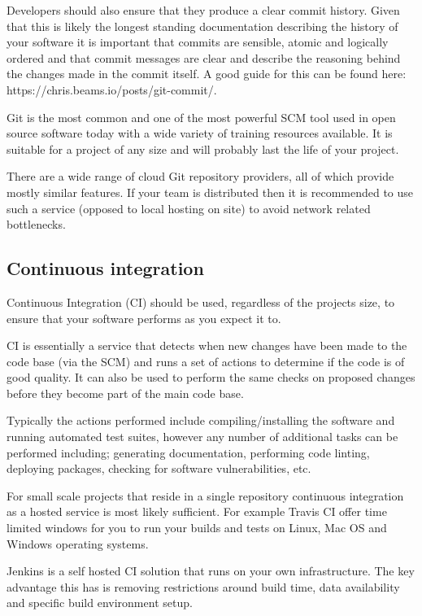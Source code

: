 \documentclass[jnr]{iosart2x}
\begin{document}
Developers should also ensure that they produce a clear commit history.
Given that this is likely the longest standing documentation describing the history of your software it is important that commits are sensible, atomic and logically ordered and that commit messages are clear and describe the reasoning behind the changes made in the commit itself.
A good guide for this can be found here: https://chris.beams.io/posts/git-commit/.

Git \cite{Git} is the most common and one of the most powerful SCM tool used in open source software today with a wide variety of training resources available.
It is suitable for a project of any size and will probably last the life of your project.

There are a wide range of cloud Git repository providers, all of which provide mostly similar features.
If your team is distributed then it is recommended to use such a service (opposed to local hosting on site) to avoid network related bottlenecks.

\subsection{Continuous integration}
\label{Continuous integration}

Continuous Integration (CI) should be used, regardless of the projects size, to ensure that your software performs as you expect it to.

CI is essentially a service that detects when new changes have been made to the code base (via the SCM) and runs a set of actions to determine if the code is of good quality.
It can also be used to perform the same checks on proposed changes before they become part of the main code base.

Typically the actions performed include compiling/installing the software and running automated test suites, however any number of additional tasks can be performed including; generating documentation, performing code linting, deploying packages, checking for software vulnerabilities, etc.

For small scale projects that reside in a single repository continuous integration as a hosted service is most likely sufficient.
For example Travis CI \cite{Travis_CI} offer time limited windows for you to run your builds and tests on Linux, Mac OS and Windows operating systems.

Jenkins \cite{Jenkins} is a self hosted CI solution that runs on your own infrastructure.
The key advantage this has is removing restrictions around build time, data availability and specific build environment setup.
\end{document}
